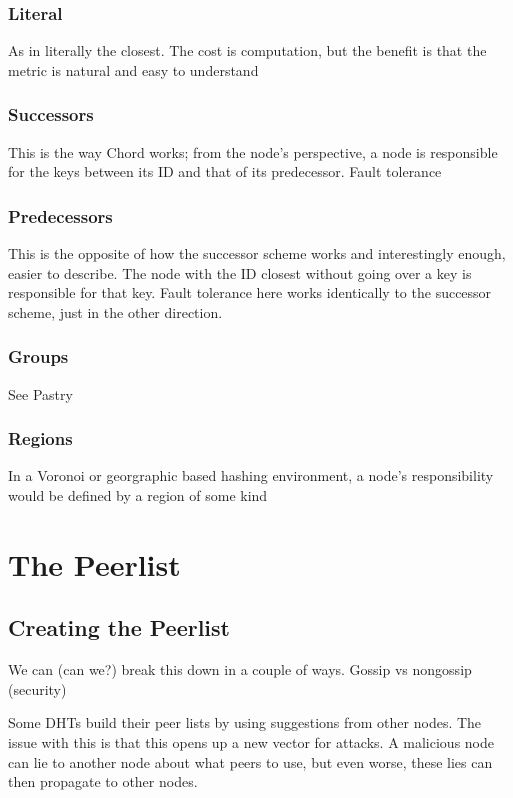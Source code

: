 \documentclass[10pt,letterpaper]{report}
\begin{document}
\subsubsection{Literal}
As in literally the closest.  The cost is computation, but the benefit is that the metric is natural and easy to understand

\subsubsection{Successors}
This is the way Chord works;  from the node's perspective, a node is responsible for the keys between its ID and that of its predecessor.   Fault tolerance

\subsubsection{Predecessors}
This is the opposite of how the successor scheme works and interestingly enough, easier to describe.  The node with the ID closest without going over a key is responsible for that key.  Fault tolerance here works identically to the successor scheme, just in the other direction.


\subsubsection{Groups}

See Pastry

\subsubsection{Regions}
In a Voronoi or georgraphic based hashing environment, a node's responsibility would be defined by a region of some kind





\section{The Peerlist}


\subsection{Creating the Peerlist}
We can (can we?) break this down in a couple of ways.  Gossip vs nongossip (security)


Some DHTs build their peer lists by using suggestions from other nodes.  The issue with this is that this opens up a new vector for attacks.   A malicious node can lie to another node about what peers to use, but even worse, these lies can then propagate to other nodes.
\end{document}
